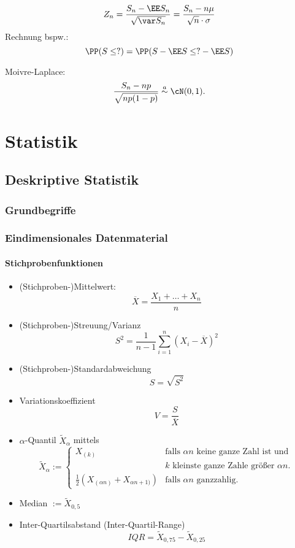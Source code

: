 \documentclass{scrreprt}
\begin{document}
$$Z_n=\frac{S_n-\EE S_n}{\sqrt{\var S_n}}=\frac{S_n - n \mu}{\sqrt{n}\cdot \sigma}$$
Rechnung bspw.:
$$\PP(S \leq ?) = \PP( S - \EE S \leq ? - \EE S)$$

Moivre-Laplace:
$$\frac{S_n - np}{\sqrt{np (1-p)}} \overset{a}{\sim} \cN(0,1)\text{.}$$

\chapter{Statistik}
\section{Deskriptive Statistik}
\subsection{Grundbegriffe}

\subsection{Eindimensionales Datenmaterial}

\subsubsection{Stichprobenfunktionen}
\begin{itemize}
\item (Stichproben-)Mittelwert:
$$\overline{X}=\frac{X_1+\ldots + X_n}{n}$$
\item (Stichproben-)Streuung/Varianz
$$S^2=\frac{1}{n-1} \sum_{i=1}^n (X_i - \overline{X})^2$$
\item (Stichproben-)Standardabweichung
$$S=\sqrt{S^2}$$
\item Variationskoeffizient
$$V=\frac{S}{\overline{X}}$$
\item $\alpha$-Quantil $\widetilde{X}_\alpha$ mittels
$$\widetilde{X}_\alpha := \begin{cases}
X_{(k)} & \text{falls }\alpha n\text{ keine ganze Zahl ist und }\\
& k\text{ kleinste ganze Zahle größer }\alpha n\text{.}\\
\frac{1}{2}(X_{(\alpha n)}+X_{\alpha n+1)}) & \text{falls }\alpha n\text{ ganzzahlig.}
\end{cases}$$
\item Median $:=\widetilde{X}_{0,5}$
\item Inter-Quartilsabstand (Inter-Quartil-Range)
$$IQR = \widetilde{X}_{0,75}-\widetilde{X}_{0,25}$$
\end{itemize}
\end{document}
